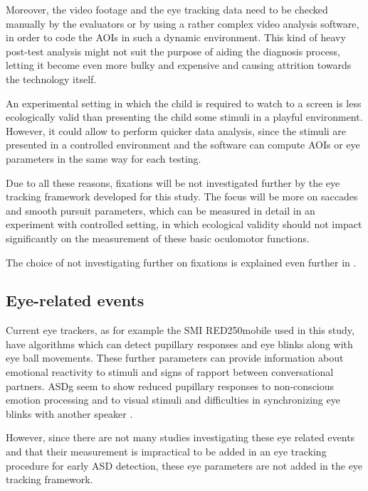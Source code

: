 Moreover, the video footage and the eye tracking data need to be checked manually by the evaluators or by using a rather complex video analysis software, in order to code the AOIs in such a dynamic environment. This kind of heavy post-test analysis might not suit the purpose of aiding the diagnosis process, letting it become even more bulky and expensive and causing attrition towards the technology itself.

An experimental setting in which the child is required to watch to a screen is less ecologically valid than presenting the child some stimuli in a playful environment. However, it could allow to perform quicker data analysis, since the stimuli are presented in a controlled environment and the software can compute AOIs or eye parameters in the same way for each testing.

Due to all these reasons, fixations will be not investigated further by the eye tracking framework developed for this study. The focus will be more on saccades and smooth pursuit parameters, which can be measured in detail in an experiment with controlled setting, in which ecological validity should not impact significantly on the measurement of these basic oculomotor functions.

The choice of not investigating further on fixations is explained even further in .



\subsection{Eye-related events}
\label{sec:eyerelatedevents}

Current eye trackers, as for example the SMI RED250mobile used in this study, have algorithms which can detect pupillary responses and eye blinks along with eye ball movements. These further parameters can provide information about emotional reactivity to stimuli and signs of rapport between conversational partners. ASDg seem to show reduced pupillary responses to non-conscious emotion processing and to visual stimuli \citep{nuske2014pupil,martineau2011pupil} and difficulties in synchronizing eye blinks with another speaker \citep{nakan02011blinks}.

However, since there are not many studies investigating these eye related events and that their measurement is impractical to be added in an eye tracking procedure for early ASD detection, these eye parameters are not added in the eye tracking framework.

